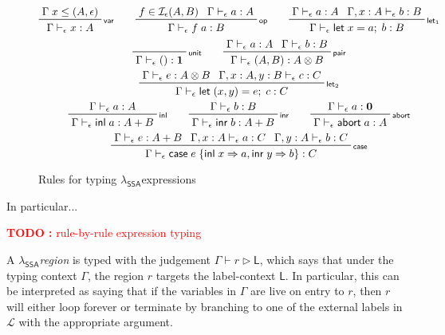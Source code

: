 \documentclass[acmsmall,screen,review]{acmart}
\newcounter{todos}
\newcommand{\TODO}[1]{{
  \stepcounter{todos}
  \begin{center}\large{\textcolor{red}{\textbf{TODO \arabic{todos}:} #1}}\end{center}
}}
\newcommand{\mc}[1]{\ensuremath{\mathcal{#1}}}
\newcommand{\mb}[1]{\ensuremath{\mathbf{#1}}}
\newcommand{\ms}[1]{\ensuremath{\mathsf{#1}}}
\newcommand{\lto}{\Rightarrow}
\newcommand{\linl}[1]{\ms{inl}\;{#1}}
\newcommand{\linr}[1]{\ms{inr}\;{#1}}
\newcommand{\labort}[1]{\ms{abort}\;{#1}}
\newcommand{\letexpr}[3]{\ensuremath{\ms{let}\;#1 = #2;\;#3}}
\newcommand{\caseexpr}[5]{\ms{case}\;#1\;\{\linl{#2} \lto #3, \linr{#4} \lto #5\}}
\newcommand{\bhyp}[2]{#1 : #2}
\newcommand{\rle}[1]{{\scriptsize\textsf{#1}}}
\newcommand{\hasty}[4]{#1 \vdash_{#2} #3: {#4}}
\newcommand{\haslb}[3]{#1 \vdash #2 \rhd #3}
\newcommand{\isop}[4]{#1 \in \mc{I}_{#4}(#2, #3)}
\newcommand{\isotopessa}{\(\lambda_{\ms{SSA}}\)}
\begin{document}
\begin{figure}[H]
  \begin{gather*}
    \prftree[r]{\rle{var}}{\Gamma\;x \leq (A, \epsilon)}{\hasty{\Gamma}{\epsilon}{x}{A}} \qquad
    \prftree[r]{\rle{op}}{\isop{f}{A}{B}{\epsilon}}{\hasty{\Gamma}{\epsilon}{a}{A}}
      {\hasty{\Gamma}{\epsilon}{f\;a}{B}} \qquad
    \prftree[r]{\rle{let$_1$}}
      {\hasty{\Gamma}{\epsilon}{a}{A}}
      {\hasty{\Gamma, \bhyp{x}{A}}{\epsilon}{b}{B}}
      {\hasty{\Gamma}{\epsilon}{\letexpr{x}{a}{b}}{B}} \\
    \prftree[r]{\rle{unit}}{\hasty{\Gamma}{\epsilon}{()}{\mb{1}}} \qquad
    \prftree[r]{\rle{pair}}{\hasty{\Gamma}{\epsilon}{a}{A}}{\hasty{\Gamma}{\epsilon}{b}{B}}
      {\hasty{\Gamma}{\epsilon}{(A, B)}{A \otimes B}} \\
    \prftree[r]{\rle{let$_2$}}
      {\hasty{\Gamma}{\epsilon}{e}{A \otimes B}}
      {\hasty{\Gamma, \bhyp{x}{A}, \bhyp{y}{B}}{\epsilon}{c}{C}}
      {\hasty{\Gamma}{\epsilon}{\letexpr{(x, y)}{e}{c}}{C}} \\
    \prftree[r]{\rle{inl}}{\hasty{\Gamma}{\epsilon}{a}{A}}
      {\hasty{\Gamma}{\epsilon}{\linl{a}}{A + B}} \qquad
    \prftree[r]{\rle{inr}}{\hasty{\Gamma}{\epsilon}{b}{B}}
      {\hasty{\Gamma}{\epsilon}{\linr{b}}{A + B}} \qquad
    \prftree[r]{\rle{abort}}{\hasty{\Gamma}{\epsilon}{a}{\mb{0}}}
      {\hasty{\Gamma}{\epsilon}{\labort{a}}{A}} \\
    \prftree[r]{\rle{case}}
      {\hasty{\Gamma}{\epsilon}{e}{A + B}}
      {\hasty{\Gamma, \bhyp{x}{A}}{\epsilon}{a}{C}}
      {\hasty{\Gamma, \bhyp{y}{A}}{\epsilon}{b}{C}}
      {\hasty{\Gamma}{\epsilon}{\caseexpr{e}{x}{a}{y}{b}}{C}}
  \end{gather*}
  \caption{Rules for typing \isotopessa expressions}
  \label{fig:ssa-expr-rules}
\end{figure}

In particular...

\TODO{rule-by-rule expression typing}

A \isotopessa \textit{region} is typed with the judgement $\haslb{\Gamma}{r}{\ms{L}}$, which says
that under the typing context $\Gamma$, the region $r$ targets the label-context $\ms{L}$. In
particular, this can be interpreted as saying that if the variables in $\Gamma$ are live on entry to
$r$, then $r$ will either loop forever or terminate by branching to one of the external labels in
$\mc{L}$ with the appropriate argument.
\end{document}
